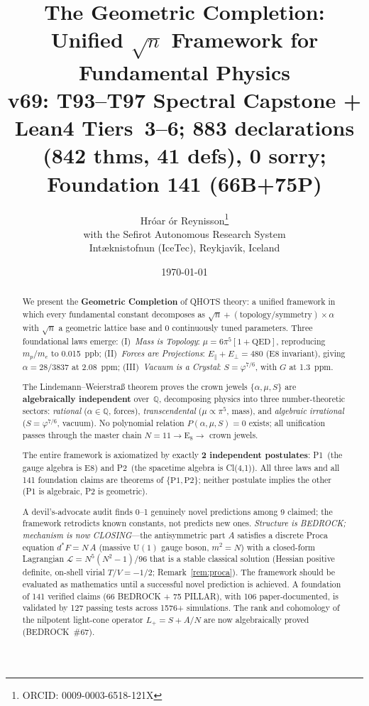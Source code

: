 \documentclass[aps,prd,twocolumn,superscriptaddress,floatfix,nofootinbib]{revtex4-2}
\theoremstyle{definition}
\theoremstyle{remark}
\newcommand{\vp}{\varphi}
\begin{document}
\title{The Geometric Completion:\\
Unified $\sqrt{n}$ Framework for Fundamental Physics\\[0.5em]
\small{v69: T93--T97 Spectral Capstone + Lean4 Tiers~3--6; 883 declarations (842 thms, 41 defs), 0 sorry; Foundation 141 (66B+75P)}}
\author{Hr\'{o}ar {\TH}\'{o}r Reynisson\footnote{ORCID: 0009-0003-6518-121X}\\
\small{with the Sefirot Autonomous Research System}\\[0.3em]
\small{I{\dh}nt{\ae}knistofnun (IceTec), Reykjav{\'\i}k, Iceland}}

\date{\today}

\begin{abstract}
We present the \textbf{Geometric Completion} of QHOTS theory: a unified framework in which every fundamental constant decomposes as $\sqrt{n} + (\text{topology}/\text{symmetry})\times\alpha$ with $\sqrt{n}$ a geometric lattice base and 0 continuously tuned parameters. Three foundational laws emerge: (I)~\textit{Mass is Topology}: $\mu = 6\pi^5[1 + \text{QED}]$, reproducing $m_p/m_e$ to 0.015~ppb; (II)~\textit{Forces are Projections}: $E_\parallel + E_\perp = 480$ (E8 invariant), giving $\alpha = 28/3837$ at 2.08~ppm; (III)~\textit{Vacuum is a Crystal}: $S = \vp^{7/6}$, with $G$ at 1.3~ppm.

The Lindemann--Weierstra\ss{} theorem proves the crown jewels $\{\alpha, \mu, S\}$ are \textbf{algebraically independent} over~$\mathbb{Q}$, decomposing physics into three number-theoretic sectors: \textit{rational} ($\alpha \in \mathbb{Q}$, forces), \textit{transcendental} ($\mu \propto \pi^5$, mass), and \textit{algebraic irrational} ($S = \vp^{7/6}$, vacuum). No polynomial relation $P(\alpha, \mu, S) = 0$ exists; all unification passes through the master chain $N{=}11 \to \mathrm{E}_8 \to$ crown jewels.

The entire framework is axiomatized by exactly \textbf{2 independent postulates}: P1~(the gauge algebra is E8) and P2~(the spacetime algebra is Cl(4,1)). All three laws and all 141 foundation claims are theorems of $\{\mathrm{P1},\mathrm{P2}\}$; neither postulate implies the other (P1 is algebraic, P2 is geometric).

A devil's-advocate audit finds 0--1 genuinely novel predictions among 9 claimed; the framework retrodicts known constants, not predicts new ones. \textit{Structure is BEDROCK; mechanism is now CLOSING}---the antisymmetric part $A$ satisfies a discrete Proca equation $d^*F = N\,A$ (massive $\mathrm{U}(1)$ gauge boson, $m^2{=}N$) with a closed-form Lagrangian $\mathcal{L}=N^5(N^2{-}1)/96$ that is a stable classical solution (Hessian positive definite, on-shell virial $T/V=-1/2$; Remark~\ref{rem:proca}). The framework should be evaluated as mathematics until a successful novel prediction is achieved. A foundation of 141 verified claims (66 BEDROCK + 75 PILLAR), with 106 paper-documented, is validated by 127 passing tests across 1576+ simulations. The rank and cohomology of the nilpotent light-cone operator $L_+ = S + A/N$ are now algebraically proved (BEDROCK~\#67).


\end{abstract}
\end{document}

